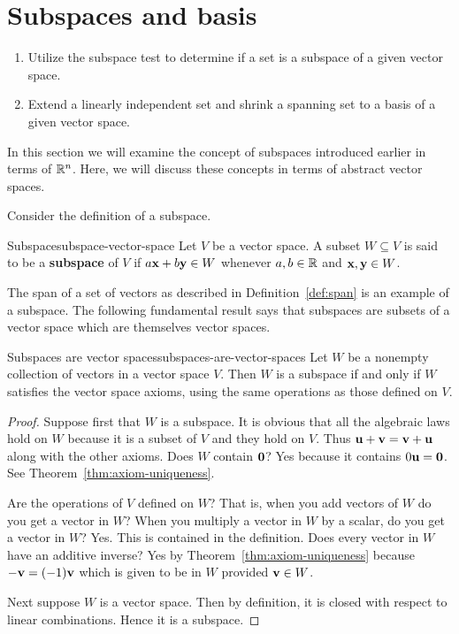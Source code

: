\section{Subspaces and basis}

\begin{outcome}
  \begin{enumerate}
  \item Utilize the subspace test to determine if a set is a subspace
    of a given vector space.
  \item Extend a linearly independent set and shrink a spanning set to
    a basis of a given vector space.
  \end{enumerate}
\end{outcome}

In this section we will examine the concept of subspaces introduced earlier in terms of $\mathbb{R}^n$. Here, we will discuss these concepts in terms of abstract vector spaces.

Consider the definition of a subspace.

\begin{definition}{Subspace}{subspace-vector-space}
Let $V$ be a vector space. A subset $W\subseteq V$ is said to be a \textbf{subspace} of $V$ if $a\mbox{\bf x}+b\mbox{\bf y}
\in W$ whenever $a,b\in \mathbb{R}$ and $\mbox{\bf x},\mbox{\bf y}\in W$.
\end{definition}

The span of a set of vectors as described in Definition~\ref{def:span} is an example of a subspace. The following fundamental result says that subspaces are subsets of a
vector space which are themselves vector spaces.

\begin{theorem}{Subspaces are vector spaces}{subspaces-are-vector-spaces}
Let $W$ be a nonempty collection of vectors in a vector space $V$. Then $W$
is a subspace if and only if $W$ satisfies the vector space axioms, using the same
operations as those defined on $V$.
\end{theorem}

\begin{proof}
Suppose first that $W$ is a subspace. It is obvious that
all the algebraic laws hold on $W$ because it is a subset of $V$ and they
hold on $V$. Thus $\mbox{\bf u}+\mbox{\bf v}=\mbox{\bf v}+\mbox{\bf u}$ along with the other axioms. Does $W$
contain $\mbox{\bf 0}$? Yes because it contains $0\mbox{\bf u}=\mbox{\bf 0}$. See
Theorem~\ref{thm:axiom-uniqueness}.

 Are the operations of $V$ defined on $W$? That is,
when you add vectors of $W$ do you get a vector in $W$? When you multiply a
vector in $W$ by a scalar, do you get a vector in $W$? Yes. This is
contained in the definition. Does every vector in $W$ have an additive
inverse? Yes by Theorem~\ref{thm:axiom-uniqueness} because $-\mbox{\bf v}=(
-1) \mbox{\bf v}$ which is given to be in $W$ provided $\mbox{\bf v}\in W$.

Next suppose $W$ is a vector space. Then by definition, it is closed with
respect to linear combinations. Hence it is a subspace.
\end{proof}


